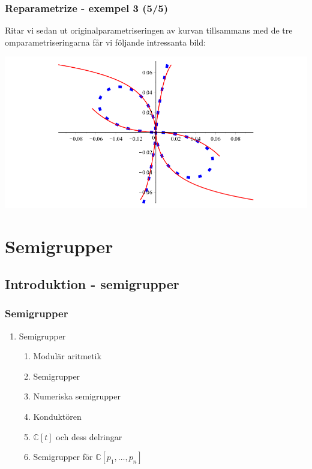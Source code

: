 \documentclass{beamer}
\begin{document}
\begin{frame}
	\frametitle{Reparametrize - exempel 3 (5/5)}
	
	\begin{example}
		Ritar vi sedan ut originalparametriseringen av kurvan tillsammans med de tre omparametriseringarna får vi följande intressanta bild:

		\begin{center}
			\includegraphics[scale=0.35]{Export/kurvorplot2d3.png}
		\end{center}
	\end{example}
\end{frame}








\section{Semigrupper}
\subsection{Introduktion - semigrupper}


\begin{frame}
	\frametitle{Semigrupper}
	\begin{enumerate}
		\item<1-> Semigrupper
		\begin{enumerate}
			\item<2-> Modulär aritmetik
			\item<3-> Semigrupper
			\item<4-> Numeriska semigrupper
			\item<5-> Konduktören
			\item<6-> $\mathbb{C}[t]$ och dess delringar
			\item<7-> Semigrupper för $\mathbb{C}[p_1,\ldots,p_n]$
		\end{enumerate}
	\end{enumerate}
\end{frame}
\end{document}
